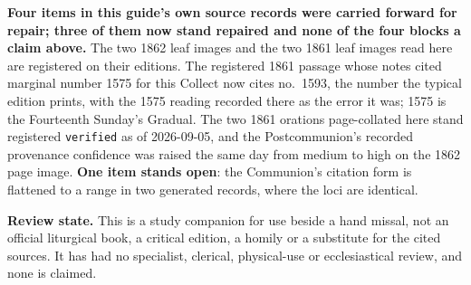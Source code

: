 \textbf{Four items in this guide's own source records were carried forward for
repair; three of them now stand repaired and none of the four blocks a claim
above.} The two 1862 leaf images and the two 1861 leaf images read here are
registered on their editions. The registered 1861 passage whose notes cited
marginal number 1575 for this Collect now cites no.~1593, the number the
typical edition prints, with the 1575 reading recorded there as the error it
was; 1575 is the Fourteenth Sunday's Gradual. The two 1861 orations
page-collated here stand registered \texttt{verified} as of 2026-09-05, and the
Postcommunion's recorded provenance confidence was raised the same day from
medium to high on the 1862 page image. \textbf{One item stands open}: the
Communion's citation form is flattened to a range in two generated records,
where the loci are identical.

\textbf{Review state.} This is a study companion for use beside a hand missal,
not an official liturgical book, a critical edition, a homily or a substitute
for the cited sources. It has had no specialist, clerical, physical-use or
ecclesiastical review, and none is claimed.

\clearpage

